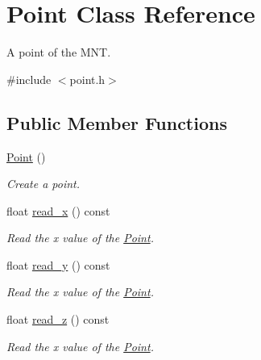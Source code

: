 \hypertarget{classPoint}{}\section{Point Class Reference}
\label{classPoint}


A point of the M\+NT.  




{\ttfamily \#include $<$point.\+h$>$}

\subsection*{Public Member Functions}
\begin{DoxyCompactItemize}
\item 
\mbox{\label{classPoint_ad92f2337b839a94ce97dcdb439b4325a}} 
\hyperlink{classPoint_ad92f2337b839a94ce97dcdb439b4325a}{Point} ()
\begin{DoxyCompactList}\small\item\em Create a point. \end{DoxyCompactList}\item 
\mbox{\label{classPoint_a497feb03e729bdcbf26f3ae1a74221c1}} 
float \hyperlink{classPoint_a497feb03e729bdcbf26f3ae1a74221c1}{read\+\_\+x} () const
\begin{DoxyCompactList}\small\item\em Read the x value of the \hyperlink{classPoint}{Point}. \end{DoxyCompactList}\item 
\mbox{\label{classPoint_a2bc96b86a6b4ea85d6160d0edf5a9060}} 
float \hyperlink{classPoint_a2bc96b86a6b4ea85d6160d0edf5a9060}{read\+\_\+y} () const
\begin{DoxyCompactList}\small\item\em Read the x value of the \hyperlink{classPoint}{Point}. \end{DoxyCompactList}\item 
\mbox{\label{classPoint_a67d9f7f9eee8a73b0d66149b85535fad}} 
float \hyperlink{classPoint_a67d9f7f9eee8a73b0d66149b85535fad}{read\+\_\+z} () const
\begin{DoxyCompactList}\small\item\em Read the x value of the \hyperlink{classPoint}{Point}. \end{DoxyCompactList}\item 

\end{DoxyCompactItemize}
